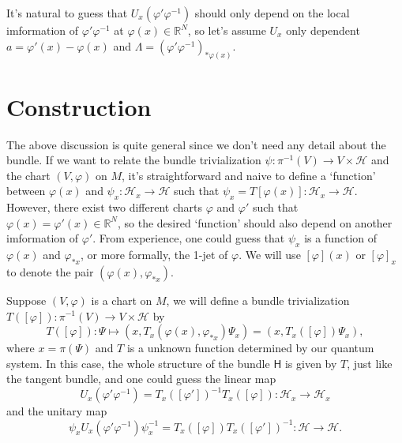 \documentclass[12pt]{extarticle}
\theoremstyle{definition}
\theoremstyle{plain}
\begin{document}
It's natural to guess that $U_x(\varphi'\varphi^{-1})$ should only depend on the local imformation of $\varphi'\varphi^{-1}$ at $\varphi(x)\in \mathbb R^N$, so let's assume $U_x$ only dependent $a=\varphi'(x)-\varphi(x)$ and $\Lambda=(\varphi'\varphi^{-1})_{*\varphi(x)}$.

\section{Construction}

The above discussion is quite general since we don't need any detail about the bundle. If we want to relate the bundle trivialization $\psi:\pi^{-1}(V)\to V\times \mathcal H$ and the chart $(V,\varphi)$ on $M$, it's straightforward and naive to define a `function' between $\varphi(x)$ and $\psi_x:\mathcal H_x\to \mathcal H$ such that $\psi_x=T[\varphi(x)]:\mathcal H_x\to \mathcal H$. However, there exist two different charts $\varphi$ and $\varphi'$ such that $\varphi(x)=\varphi'(x)\in \mathbb R^N$, so the desired `function' should also depend on another imformation of $\varphi'$. 
From experience, one could guess that $\psi_x$ is a function of $\varphi(x)$ and $\varphi_{*x}$, or more formally, the 1-jet of $\varphi$. We will use $[\varphi](x)$ or $[\varphi]_x$ to denote the pair $(\varphi(x),\varphi_{*x})$.

Suppose $(V,\varphi)$ is a chart on $M$, we will define a bundle trivialization $T([\varphi]):\pi^{-1}(V)\to V\times \mathcal H$ by 
\[
	T([\varphi]):\Psi\mapsto (x,T_x(\varphi(x),\varphi_{*x})\Psi_x)=(x,T_x([\varphi])\Psi_x),
\]
where $x=\pi(\Psi)$ and $T$ is a unknown function determined by our quantum system. In this case, the whole structure of the bundle $\mathsf H$ is given by $T$, just like the tangent bundle, and one could guess the linear map
\begin{equation}
	U_x(\varphi'\varphi^{-1})=T_{x}([\varphi'])^{-1}T_{x}([\varphi]):\mathcal H_x\to \mathcal H_x
\end{equation}
and the unitary map
\[
	\psi_x U_x(\varphi'\varphi^{-1})\psi_x^{-1}=T_{x}([\varphi])T_{x}([\varphi'])^{-1}:\mathcal H\to \mathcal H.
\]

\end{document}
